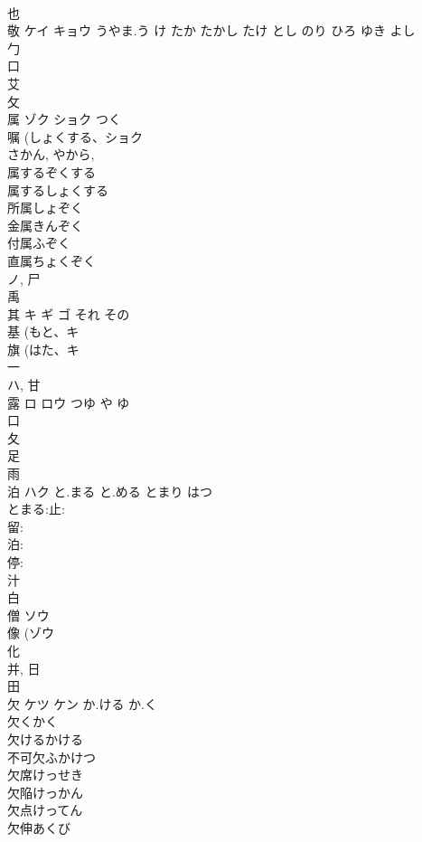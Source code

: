 \documentclass[8pt]{extreport}
\begin{document}
\begin{CJK}{UTF8}{min}
\\	也 
\\	敬	ケイ キョウ	うやま.う け たか たかし たけ とし のり ひろ ゆき よし	
\\	勹 
\\	口 
\\	艾 
\\	攵 
\\	属	ゾク ショク	つく	
\\	嘱 (しょくする、ショク 
\\	さかん, やから, 
\\	属するぞくする
\\	属するしょくする
\\	所属しょぞく
\\	金属きんぞく
\\	付属ふぞく
\\	直属ちょくぞく
\\	ノ, 尸 
\\	禹 
\\	其	キ ギ ゴ	それ その	
\\	基 (もと、キ 
\\	旗 (はた、キ 
\\	一 
\\	ハ, 甘 
\\	露	ロ ロウ	つゆ や ゆ	
\\	口 
\\	夂 
\\	足 
\\	雨 
\\	泊	ハク	と.まる と.める とまり はつ	
\\	とまる:止: 
\\	留: 
\\	泊: 
\\	停: 
\\	汁 
\\	白 
\\	僧	ソウ		
\\	像 (ゾウ 
\\	化 
\\	并, 日 
\\	田 
\\	欠	ケツ ケン	か.ける か.く	
\\	欠くかく 
\\	欠けるかける 
\\	不可欠ふかけつ 
\\	欠席けっせき 
\\	欠陥けっかん 
\\	欠点けってん 
\\	欠伸あくび 

\end{CJK}
\end{document}
